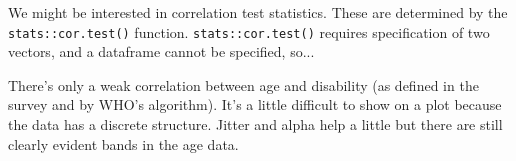 \documentclass[titlepage]{book}\usepackage{knitr}
\begin{document}
\begin{knitrout}
\color{fgcolor}
\end{knitrout}


\begin{knitrout}
\color{fgcolor}
\end{knitrout}

We might be interested in correlation test statistics. These are determined by the \texttt{stats::cor.test()} function.  \texttt{stats::cor.test()} requires specification of two vectors, and a dataframe cannot be specified, so...

\begin{knitrout}
\color{fgcolor}\begin{kframe}
\begin{alltt}
  \hlopt{$}\hlopt{$}  \hlstd{=} \hlstd{)}
\end{alltt}
\end{kframe}
\end{knitrout}


There's only a weak correlation between age and disability (as defined in the survey and by WHO's algorithm). It's a little difficult to show on a plot because the data has a discrete structure.  Jitter and alpha help a little but there are still clearly evident bands in the age data.
\end{document}
